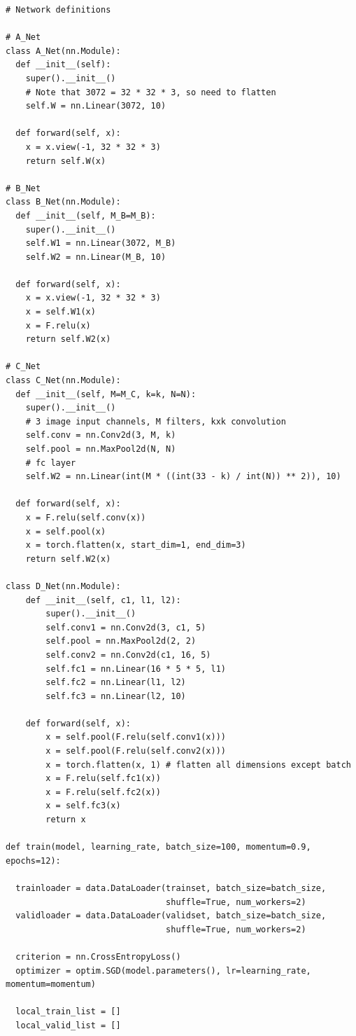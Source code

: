 \documentclass{article}
\newcommand{\1}{\mathbf{1}}
\begin{document}
{\begin{verbatim}
# Network definitions

# A_Net
class A_Net(nn.Module):
  def __init__(self):
    super().__init__()
    # Note that 3072 = 32 * 32 * 3, so need to flatten
    self.W = nn.Linear(3072, 10)

  def forward(self, x):
    x = x.view(-1, 32 * 32 * 3)
    return self.W(x)

# B_Net
class B_Net(nn.Module):
  def __init__(self, M_B=M_B):
    super().__init__()
    self.W1 = nn.Linear(3072, M_B)
    self.W2 = nn.Linear(M_B, 10)

  def forward(self, x):
    x = x.view(-1, 32 * 32 * 3)
    x = self.W1(x)
    x = F.relu(x)
    return self.W2(x)

# C_Net
class C_Net(nn.Module):
  def __init__(self, M=M_C, k=k, N=N):
    super().__init__()
    # 3 image input channels, M filters, kxk convolution
    self.conv = nn.Conv2d(3, M, k)
    self.pool = nn.MaxPool2d(N, N)
    # fc layer
    self.W2 = nn.Linear(int(M * ((int(33 - k) / int(N)) ** 2)), 10)

  def forward(self, x):
    x = F.relu(self.conv(x))
    x = self.pool(x)
    x = torch.flatten(x, start_dim=1, end_dim=3)
    return self.W2(x)

class D_Net(nn.Module):
    def __init__(self, c1, l1, l2):
        super().__init__()
        self.conv1 = nn.Conv2d(3, c1, 5)
        self.pool = nn.MaxPool2d(2, 2)
        self.conv2 = nn.Conv2d(c1, 16, 5)
        self.fc1 = nn.Linear(16 * 5 * 5, l1)
        self.fc2 = nn.Linear(l1, l2)
        self.fc3 = nn.Linear(l2, 10)

    def forward(self, x):
        x = self.pool(F.relu(self.conv1(x)))
        x = self.pool(F.relu(self.conv2(x)))
        x = torch.flatten(x, 1) # flatten all dimensions except batch
        x = F.relu(self.fc1(x))
        x = F.relu(self.fc2(x))
        x = self.fc3(x)
        return x

def train(model, learning_rate, batch_size=100, momentum=0.9, epochs=12):

  trainloader = data.DataLoader(trainset, batch_size=batch_size,
                                shuffle=True, num_workers=2)
  validloader = data.DataLoader(validset, batch_size=batch_size,
                                shuffle=True, num_workers=2)

  criterion = nn.CrossEntropyLoss()
  optimizer = optim.SGD(model.parameters(), lr=learning_rate, momentum=momentum)

  local_train_list = []
  local_valid_list = []


\end{verbatim}}
\end{document}
